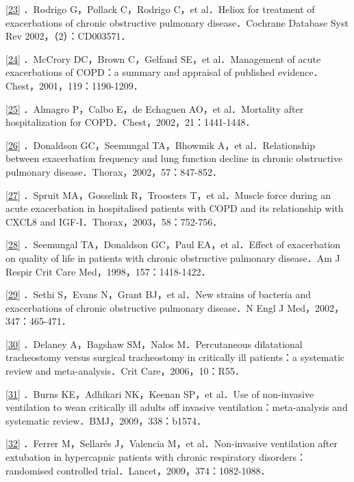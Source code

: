 \protect\hyperlink{text00012.htmlux5cux23ch23-11-back}{{[}23{]}}
．Rodrigo G，Pollack C，Rodrigo C，et al．Heliox for treatment of
exacerbations of chronic obstructive pulmonary disease．Cochrane
Database Syst Rev 2002，（2）：CD003571．

\protect\hyperlink{text00012.htmlux5cux23ch24-11-back}{{[}24{]}}
．McCrory DC，Brown C，Gelfand SE，et al．Management of acute
exacerbations of COPD：a summary and appraisal of published
evidence．Chest，2001，119：1190-1209．

\protect\hyperlink{text00012.htmlux5cux23ch25-11-back}{{[}25{]}}
．Almagro P，Calbo E，de Echaguen AO，et al．Mortality after
hospitalization for COPD．Chest，2002，21：1441-1448．

\protect\hyperlink{text00012.htmlux5cux23ch26-11-back}{{[}26{]}}
．Donaldson GC，Seemungal TA，Bhowmik A，et al．Relationship between
exacerbation frequency and lung function decline in chronic obstructive
pulmonary disease．Thorax，2002，57：847-852．

\protect\hyperlink{text00012.htmlux5cux23ch27-11-back}{{[}27{]}}
．Spruit MA，Gosselink R，Troosters T，et al．Muscle force during an
acute exacerbation in hospitalised patients with COPD and its
relationship with CXCL8 and IGF-I．Thorax，2003，58：752-756．

\protect\hyperlink{text00012.htmlux5cux23ch28-11-back}{{[}28{]}}
．Seemungal TA，Donaldson GC，Paul EA，et al．Effect of exacerbation on
quality of life in patients with chronic obstructive pulmonary
disease．Am J Respir Crit Care Med，1998，157：1418-1422．

\protect\hyperlink{text00012.htmlux5cux23ch29-11-back}{{[}29{]}} ．Sethi
S，Evans N，Grant BJ，et al．New strains of bacteria and exacerbations
of chronic obstructive pulmonary disease．N Engl J
Med，2002，347：465-471．

\protect\hyperlink{text00012.htmlux5cux23ch30-11-back}{{[}30{]}}
．Delaney A，Bagshaw SM，Nalos M．Percutaneous dilatational tracheostomy
versus surgical tracheostomy in critically ill patients：a systematic
review and meta-analysis．Crit Care，2006，10：R55．

\protect\hyperlink{text00012.htmlux5cux23ch31-11-back}{{[}31{]}} ．Burns
KE，Adhikari NK，Keenan SP，et al．Use of non-invasive ventilation to
wean critically ill adults off invasive ventilation：meta-analysis and
systematic review．BMJ，2009，338：b1574．

\protect\hyperlink{text00012.htmlux5cux23ch32-11-back}{{[}32{]}}
．Ferrer M，Sellarés J，Valencia M，et al．Non-invasive ventilation
after extubation in hypercapnic patients with chronic respiratory
disorders：randomised controlled trial．Lancet，2009，374：1082-1088．

